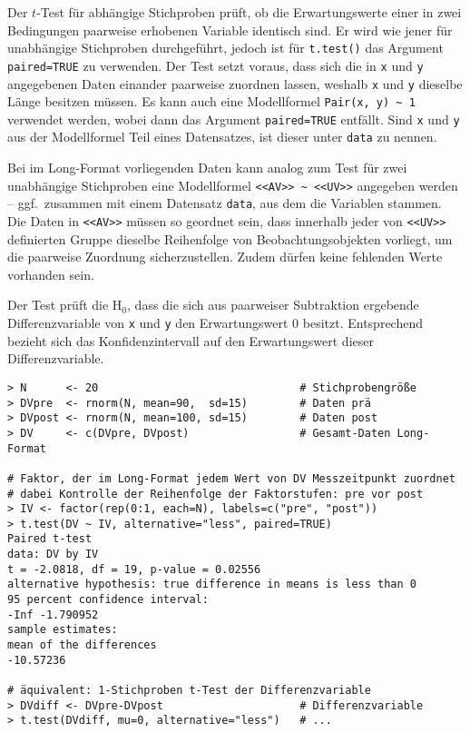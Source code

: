 Der $t$-Test für abhängige Stichproben prüft, ob die Erwartungswerte einer in zwei Bedingungen paarweise erhobenen Variable identisch sind. Er wird wie jener für unabhängige Stichproben durchgeführt, jedoch ist für \lstinline!t.test()! das Argument \lstinline!paired=TRUE! zu verwenden. Der Test setzt voraus, dass sich die in \lstinline!x! und \lstinline!y! angegebenen Daten einander paarweise zuordnen lassen, weshalb \lstinline!x! und \lstinline!y! dieselbe Länge besitzen müssen. Es kann auch eine Modellformel \lstinline!Pair(x, y) ~ 1! verwendet werden, wobei dann das Argument \lstinline!paired=TRUE! entfällt. Sind \lstinline!x! und \lstinline!y! aus der Modellformel Teil eines Datensatzes, ist dieser unter \lstinline!data! zu nennen.

Bei im Long-Format vorliegenden Daten kann analog zum Test für zwei unabhängige Stichproben eine Modellformel \lstinline!<<AV>> ~ <<UV>>! angegeben werden -- ggf.\ zusammen mit einem Datensatz \lstinline!data!, aus dem die Variablen stammen. Die Daten in \lstinline!<<AV>>! müssen so geordnet sein, dass innerhalb jeder von \lstinline!<<UV>>! definierten Gruppe dieselbe Reihenfolge von Beobachtungsobjekten vorliegt, um die paarweise Zuordnung sicherzustellen. Zudem dürfen keine fehlenden Werte vorhanden sein.

Der Test prüft die $\text{H}_{0}$, dass die sich aus paarweiser Subtraktion ergebende Differenzvariable von \lstinline!x! und \lstinline!y! den Erwartungswert $0$ besitzt. Entsprechend bezieht sich das Konfidenzintervall auf den Erwartungswert dieser Differenzvariable.
\begin{lstlisting}
> N      <- 20                               # Stichprobengröße
> DVpre  <- rnorm(N, mean=90,  sd=15)        # Daten prä
> DVpost <- rnorm(N, mean=100, sd=15)        # Daten post
> DV     <- c(DVpre, DVpost)                 # Gesamt-Daten Long-Format

# Faktor, der im Long-Format jedem Wert von DV Messzeitpunkt zuordnet
# dabei Kontrolle der Reihenfolge der Faktorstufen: pre vor post
> IV <- factor(rep(0:1, each=N), labels=c("pre", "post"))
> t.test(DV ~ IV, alternative="less", paired=TRUE)
Paired t-test
data: DV by IV
t = -2.0818, df = 19, p-value = 0.02556
alternative hypothesis: true difference in means is less than 0
95 percent confidence interval:
-Inf -1.790952
sample estimates:
mean of the differences
-10.57236

# äquivalent: 1-Stichproben t-Test der Differenzvariable
> DVdiff <- DVpre-DVpost                     # Differenzvariable
> t.test(DVdiff, mu=0, alternative="less")   # ...
\end{lstlisting}

